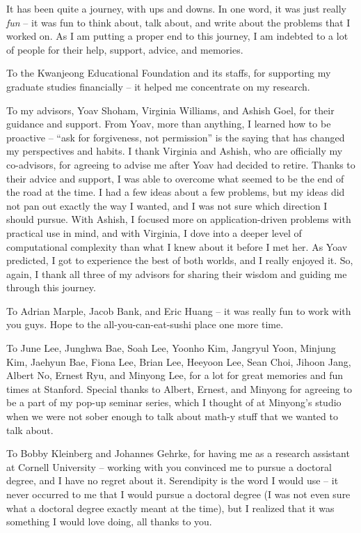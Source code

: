 It has been quite a journey, with ups and downs.
In one word, it was just really {\em fun} -- it was fun to think about, talk about, and write about the problems that I worked on. 
As I am putting a proper end to this journey, I am indebted to a lot of people for their help, support, advice, and memories.

To the Kwanjeong Educational Foundation and its staffs, for supporting my graduate studies financially -- it helped me concentrate on my research.

To my advisors, Yoav Shoham, Virginia Williams, and Ashish Goel, for their guidance and support. From Yoav, more than anything, I learned how to be proactive -- ``ask for forgiveness, not permission'' is the saying that has changed my perspectives and habits. I thank Virginia and Ashish, who are officially my co-advisors, for agreeing to advise me after Yoav had decided to retire. Thanks to their advice and support, I was able to overcome what seemed to be the end of the road at the time. I had a few ideas about a few problems, but my ideas did not pan out exactly the way I wanted, and I was not sure which direction I should pursue. With Ashish, I focused more on application-driven problems with practical use in mind, and with Virginia, I dove into a deeper level of computational complexity than what I knew about it before I met her. As Yoav predicted, I got to experience the best of both worlds, and I really enjoyed it. So, again, I thank all three of my advisors for sharing their wisdom and guiding me through this journey.

To Adrian Marple, Jacob Bank, and Eric Huang -- it was really fun to work with you guys. Hope to the all-you-can-eat-sushi place one more time.

To June Lee, Junghwa Bae, Soah Lee, Yoonho Kim, Jangryul Yoon, Minjung Kim, Jaehyun Bae, Fiona Lee, Brian Lee, Heeyoon Lee, Sean Choi, Jihoon Jang, Albert No, Ernest Ryu, and Minyong Lee, for a lot for great memories and fun times at Stanford. Special thanks to Albert, Ernest, and Minyong for agreeing to be a part of my pop-up seminar series, which I thought of at Minyong's studio when we were not sober enough to talk about math-y stuff that we wanted to talk about. 

To Bobby Kleinberg and Johannes Gehrke, for having me as a research assistant at Cornell University -- working with you convinced me to pursue a doctoral degree, and I have no regret about it. Serendipity is the word I would use -- it never occurred to me that I would pursue a doctoral degree (I was not even sure what a doctoral degree exactly meant at the time), but I realized that it was something I would love doing, all thanks to you. 


